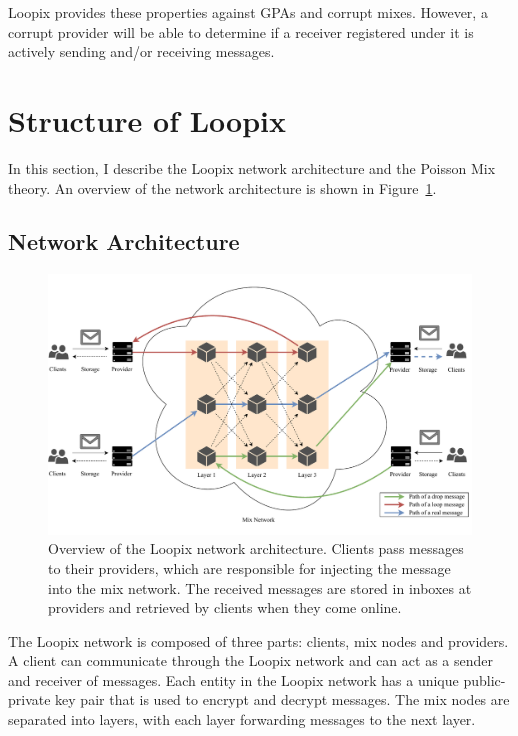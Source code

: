 \documentclass[final,dissertation.tex]{subfiles}
\begin{document}
Loopix provides these properties against GPAs and corrupt mixes. However, a corrupt provider will be able to determine if a receiver registered under it is actively sending and/or receiving messages.

\section{Structure of Loopix}

In this section, I describe the Loopix network architecture and the Poisson Mix theory. An overview of the network architecture is shown in Figure~\ref{fig:loopix_network}. 

\subsection{Network Architecture}

\begin{figure}[h]
	\includegraphics[width=\linewidth]{../figs/loopix_network}
	\caption{Overview of the Loopix network architecture. Clients pass messages to their providers, which are responsible for injecting the message into the mix network. The received messages are stored in inboxes at providers and retrieved by clients when they come online.}\label{fig:loopix_network}
\end{figure}

The Loopix network is composed of three parts: clients, mix nodes and providers. A client can communicate through the Loopix network and can act as a sender and receiver of messages. Each entity in the Loopix network has a unique public-private key pair that is used to encrypt and decrypt messages. The mix nodes are separated into layers, with each layer forwarding messages to the next layer. 
\end{document}
